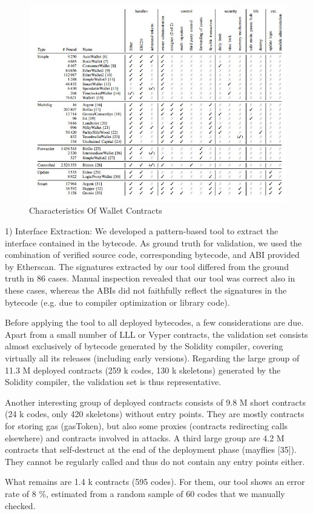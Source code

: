 \documentclass[12pt]{article}
\begin{document}
\begin{figure}[h!]
\begin{center}
\includegraphics[scale=1]{L5}
\caption{Characteristics Of Wallet Contracts}
\end{center}
\end{figure}



1) Interface Extraction: We developed a pattern-based tool
to extract the interface contained in the bytecode. As ground
truth for validation, we used the combination of verified
source code, corresponding bytecode, and ABI provided by
Etherscan. The signatures extracted by our tool differed from
the ground truth in 86 cases. Manual inspection revealed that
our tool was correct also in these cases, whereas the ABIs did
not faithfully reflect the signatures in the bytecode (e.g. due
to compiler optimization or library code).\par
Before applying the tool to all deployed bytecodes, a
few considerations are due. Apart from a small number of
LLL or Vyper contracts, the validation set consists almost
exclusively of bytecode generated by the Solidity compiler,
covering virtually all its releases (including early versions).
Regarding the large group of 11.3 M deployed contracts (259 k
codes, 130 k skeletons) generated by the Solidity compiler, the
validation set is thus representative.\par
Another interesting group of deployed contracts consists
of 9.8 M short contracts (24 k codes, only 420 skeletons)
without entry points. They are mostly contracts for storing
gas (gasToken), but also some proxies (contracts redirecting
calls elsewhere) and contracts involved in attacks. A third large
group are 4.2 M contracts that self-destruct at the end of the
deployment phase (mayflies [35]). They cannot be regularly
called and thus do not contain any entry points either.\par
What remains are 1.4 k contracts (595 codes). For them,
our tool shows an error rate of 8 \%, estimated from a random
sample of 60 codes that we manually checked.\\
\end{document}
